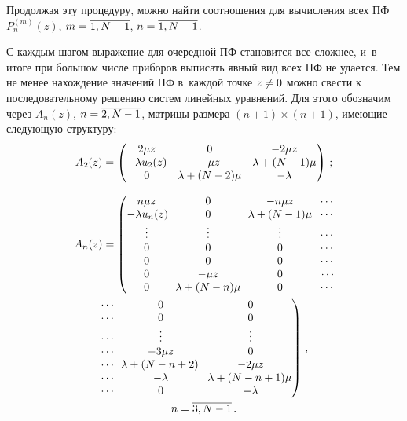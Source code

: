\begin{multicols}{2}
Продолжая эту процедуру, можно найти
соотношения для вычисления всех
ПФ $P^{(m)}_{n}(z)$, $m\hm=\overline{1,N-1}$, $n\hm=\overline{1,N-1}$.

С каждым шагом выражение для очередной ПФ становится все сложнее,
и~в итоге при большом числе приборов выписать явный вид всех ПФ не
удается. Тем не менее нахождение значений ПФ в~каждой точке $z \hm\ne
0$ можно свести к последовательному решению систем линейных
уравнений. Для этого обозначим через $A_n(z)$, $n\hm =\overline{2,N-1}$,
мат\-ри\-цы размера $(n+1)\times (n+1)$, име\-ющие
следующую структуру:
\begin{gather*}
\setcounter{MaxMatrixCols}{3}
A_2(z)=
\begin{pmatrix}
 2 \mu z   & 0  & -2 \mu z         \\
 - \lambda u_2(z) & - \mu z   &  \lambda +(N-1) \mu       \\
0  & \lambda +(N-2)\mu &    - \lambda
\end{pmatrix}\,;
\end{gather*}

\vspace*{-12pt}

\noindent
{ %
\begin{multline*}
\setcounter{MaxMatrixCols}{7}
A_n(z)=\left(
\begin{matrix}
 n \mu z   & 0  & - n \mu z &      \!\cdots\!          \\
 - \lambda u_n(z) \! & 0  & \! \lambda +(N-1) \mu \! & \!\cdots\!  \\
  \vdots   & \vdots & \vdots &  \!\cdots\! \\
 0   & 0 & 0&  \!\cdots\!  \\
 0      & 0 & 0    &     \!\cdots\! \\
 0   & - \mu z  &0   &  \cdots\! \\
0 & \!\lambda +(N-n)\mu \!&0  &  \!\cdots\!
\end{matrix}\right.\\
\left.\begin{matrix}
    \cdots\!     & 0    & 0       \\
    \cdots\!  & 0 & 0 \\
    \cdots\! & \vdots     & \vdots  \\
    \cdots\!  & - 3 \mu z     & 0   \\
    \cdots\! & \! \lambda +(N-n+2) &-2\mu z\\
    \cdots\! & - \lambda  & \! \lambda+(N-n+1)\mu\\
    \cdots\!  & 0  & - \lambda
\end{matrix}\right)\,,
\\ n =\overline{3,N-1}\,.
\end{multline*}
}


\end{multicols}
